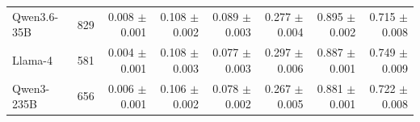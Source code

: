 \begin{table}[t]
\begin{tabular*}{\textwidth}{@{\extracolsep{\fill}}lrrrrrrr@{}}
Qwen3.6-35B & 829 & \shortstack[r]{0.008\\{\scriptsize $\pm$0.001}} & \shortstack[r]{0.108\\{\scriptsize $\pm$0.002}} & \shortstack[r]{0.089\\{\scriptsize $\pm$0.003}} & \shortstack[r]{0.277\\{\scriptsize $\pm$0.004}} & \shortstack[r]{0.895\\{\scriptsize $\pm$0.002}} & \shortstack[r]{0.715\\{\scriptsize $\pm$0.008}} \\
Llama-4 & 581 & \shortstack[r]{0.004\\{\scriptsize $\pm$0.001}} & \shortstack[r]{0.108\\{\scriptsize $\pm$0.003}} & \shortstack[r]{0.077\\{\scriptsize $\pm$0.003}} & \shortstack[r]{0.297\\{\scriptsize $\pm$0.006}} & \shortstack[r]{0.887\\{\scriptsize $\pm$0.001}} & \shortstack[r]{0.749\\{\scriptsize $\pm$0.009}} \\
Qwen3-235B & 656 & \shortstack[r]{0.006\\{\scriptsize $\pm$0.001}} & \shortstack[r]{0.106\\{\scriptsize $\pm$0.002}} & \shortstack[r]{0.078\\{\scriptsize $\pm$0.002}} & \shortstack[r]{0.267\\{\scriptsize $\pm$0.005}} & \shortstack[r]{0.881\\{\scriptsize $\pm$0.001}} & \shortstack[r]{0.722\\{\scriptsize $\pm$0.008}} \\
\bottomrule
\end{tabular*}
\end{table}
